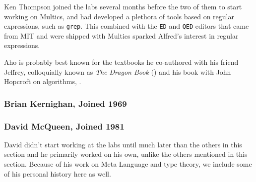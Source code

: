 Ken Thompson joined the labs several months before the two of them to
start working on Multics, and had developed a plethora of tools based on
regular expressions, such as \texttt{grep}.
This combined with the \texttt{ED} and \texttt{QED} editors that came from MIT
and were shipped with Multics sparked Alfred's interest in regular expressions.

Aho is probably best known for the textbooks he co-authored with his friend Jeffrey,
colloquially known as \textit{The Dragon Book} ()
and his book with John Hopcroft on algorithms, .

\subsubsection{Brian Kernighan, Joined 1969}

\subsubsection{David McQueen, Joined 1981}

David didn't start working at the labs until much later than the others in this section
and he primarily worked on his own, unlike the others mentioned in this section.
Because of his work on Meta Language and type theory, we include some of his personal history here
as well.
